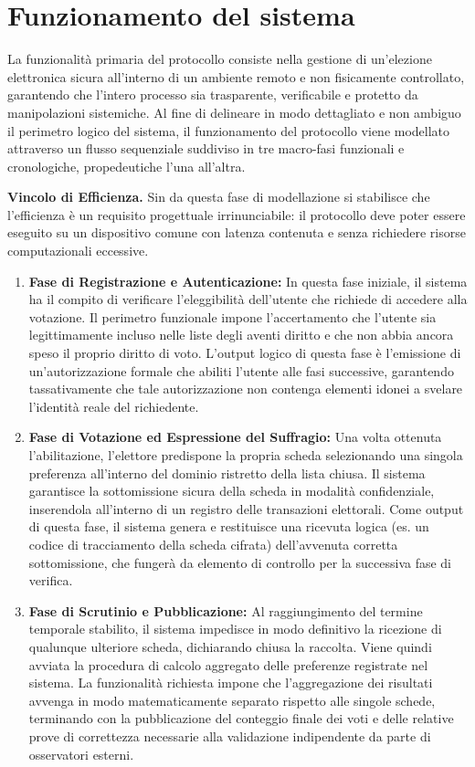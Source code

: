 \section{Funzionamento del sistema}
\label{sec:1.2_funzionamento_sistema}

La funzionalità primaria del protocollo consiste nella gestione di un'elezione elettronica sicura all'interno di un ambiente remoto e non fisicamente controllato, garantendo che l'intero processo sia trasparente, verificabile e protetto da manipolazioni sistemiche. Al fine di delineare in modo dettagliato e non ambiguo il perimetro logico del sistema, il funzionamento del protocollo viene modellato attraverso un flusso sequenziale suddiviso in tre macro-fasi funzionali e cronologiche, propedeutiche l'una all'altra.

\noindent\textbf{Vincolo di Efficienza.} Sin da questa fase di modellazione si stabilisce che l'efficienza è un requisito progettuale irrinunciabile: il protocollo deve poter essere eseguito su un dispositivo comune con latenza contenuta e senza richiedere risorse computazionali eccessive.

\begin{enumerate}
    \item \textbf{Fase di Registrazione e Autenticazione:} In questa fase iniziale, il sistema ha il compito di verificare l'eleggibilità dell'utente che richiede di accedere alla votazione. Il perimetro funzionale impone l'accertamento che l'utente sia legittimamente incluso nelle liste degli aventi diritto e che non abbia ancora speso il proprio diritto di voto. L'output logico di questa fase è l'emissione di un'autorizzazione formale che abiliti l'utente alle fasi successive, garantendo tassativamente che tale autorizzazione non contenga elementi idonei a svelare l'identità reale del richiedente.
    \item \textbf{Fase di Votazione ed Espressione del Suffragio:} Una volta ottenuta l'abilitazione, l'elettore predispone la propria scheda selezionando una singola preferenza all'interno del dominio ristretto della lista chiusa. Il sistema garantisce la sottomissione sicura della scheda in modalità confidenziale, inserendola all'interno di un registro delle transazioni elettorali. Come output di questa fase, il sistema genera e restituisce una ricevuta logica (es. un codice di tracciamento della scheda cifrata) dell'avvenuta corretta sottomissione, che fungerà da elemento di controllo per la successiva fase di verifica.
    \item \textbf{Fase di Scrutinio e Pubblicazione:} Al raggiungimento del termine temporale stabilito, il sistema impedisce in modo definitivo la ricezione di qualunque ulteriore scheda, dichiarando chiusa la raccolta. Viene quindi avviata la procedura di calcolo aggregato delle preferenze registrate nel sistema. La funzionalità richiesta impone che l'aggregazione dei risultati avvenga in modo matematicamente separato rispetto alle singole schede, terminando con la pubblicazione del conteggio finale dei voti e delle relative prove di correttezza necessarie alla validazione indipendente da parte di osservatori esterni.
\end{enumerate}

